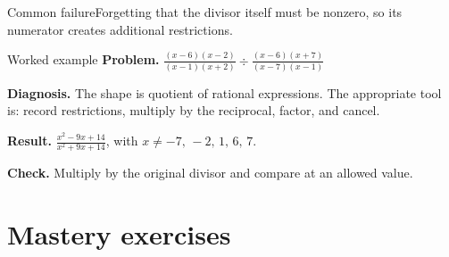 \documentclass[11pt,oneside]{book}
\begin{document}
\begin{warningbox}{Common failure}Forgetting that the divisor itself must be nonzero, so its numerator creates additional restrictions.\end{warningbox}
\begin{examplebox}{Worked example}
\textbf{Problem.} $\displaystyle \frac{\left(x - 6\right) \left(x - 2\right)}{\left(x - 1\right) \left(x + 2\right)}\div\frac{\left(x - 6\right) \left(x + 7\right)}{\left(x - 7\right) \left(x - 1\right)}$

\textbf{Diagnosis.} The shape is quotient of rational expressions. The appropriate tool is: record restrictions, multiply by the reciprocal, factor, and cancel.

\textbf{Result.} $\displaystyle \frac{x^{2} - 9 x + 14}{x^{2} + 9 x + 14}$, with $x\ne -7,\,-2,\,1,\,6,\,7$.

\textbf{Check.} Multiply by the original divisor and compare at an allowed value.
\end{examplebox}
\section{Mastery exercises}
\end{document}
